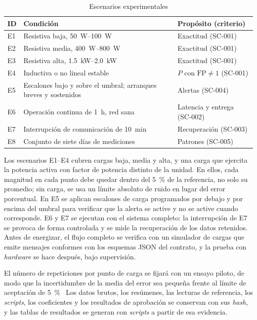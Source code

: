 \begin{table}[t]
\centering
\caption{Escenarios experimentales}
\label{tab:scenarios}
\footnotesize
\begin{tabular}{@{}l p{3.1cm} p{3.0cm}@{}}
\toprule
ID & Condición & Propósito (criterio) \\
\midrule
E1 & Resistiva baja, \SIrange{50}{100}{W} & Exactitud (SC-001) \\
E2 & Resistiva media, \SIrange{400}{800}{W} & Exactitud (SC-001) \\
E3 & Resistiva alta, \SIrange{1,5}{2,0}{kW} & Exactitud (SC-001) \\
E4 & Inductiva o no lineal estable & $P$ con $\mathrm{FP}\neq1$ (SC-001) \\
E5 & Escalones bajo y sobre el umbral; arranques breves y sostenidos & Alertas (SC-004) \\
E6 & Operación continua de \SI{1}{h}, red sana & Latencia y entrega (SC-002) \\
E7 & Interrupción de comunicación de \SI{10}{min} & Recuperación (SC-003) \\
E8 & Conjunto de siete días de mediciones & Patrones (SC-005) \\
\bottomrule
\end{tabular}
\end{table}

Los escenarios E1--E4 cubren cargas baja, media y alta, y una carga que ejercita la potencia activa con factor de potencia distinto de la unidad.
En ellos, cada magnitud en cada punto debe quedar dentro del \SI{5}{\percent} de la referencia, no solo su promedio; sin carga, se usa un límite absoluto de ruido en lugar del error porcentual.
En E5 se aplican escalones de carga programados por debajo y por encima del umbral para verificar que la alerta se active y no se active cuando corresponde.
E6 y E7 se ejecutan con el sistema completo: la interrupción de E7 se provoca de forma controlada y se mide la recuperación de los datos retenidos.
Antes de energizar, el flujo completo se verifica con un simulador de cargas que emite mensajes conformes con los esquemas JSON del contrato, y la prueba con \textit{hardware} se hace después, bajo supervisión.

El número de repeticiones por punto de carga se fijará con un ensayo piloto, de modo que la incertidumbre de la media del error sea pequeña frente al límite de aceptación de \SI{5}{\percent}~
Los datos brutos, los resúmenes, las lecturas de referencia, los \textit{scripts}, los coeficientes y los resultados de aprobación se conservan con sus \textit{hash}, y las tablas de resultados se generan con \textit{scripts} a partir de esa evidencia.

